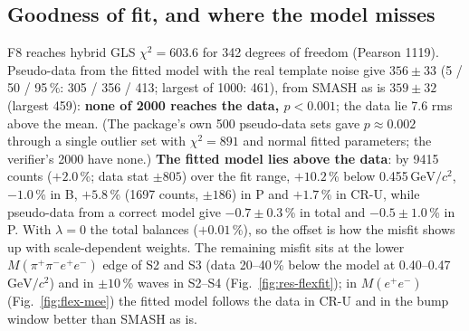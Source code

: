 \documentclass[11pt,a4paper]{article}
\newcommand{\Mfour}{\ensuremath{M(\pi^{+}\pi^{-}e^{+}e^{-})}\xspace}
\newcommand{\Mee}{\ensuremath{M(e^{+}e^{-})}\xspace}
\newcommand{\GeVcc}{\ensuremath{\mathrm{GeV}/c^{2}}\xspace}
\begin{document}
\subsection{Goodness of fit, and where the model misses}
\label{sec:flex-gof}
F8 reaches hybrid GLS $\chi^2=603.6$ for 342 degrees of freedom (Pearson 1119). Pseudo-data from the fitted model with the real template noise give
$356\pm33$ (5 / 50 / 95\,\%: 305 / 356 / 413; largest of 1000: 461), from SMASH as is $359\pm32$ (largest 459): \textbf{none of 2000 reaches the
data, $p<0.001$}; the data lie 7.6 rms above the mean. (The package's own 500 pseudo-data sets gave $p\approx0.002$ through a single outlier set with
$\chi^2=891$ and normal fitted parameters; the verifier's 2000 have none.) \textbf{The fitted model lies above the data}: by 9415 counts ($+2.0$\,\%; data
stat $\pm805$) over the fit range, $+10.2$\,\% below 0.455\,\GeVcc, $-1.0$\,\% in B, $+5.8$\,\% (1697 counts, $\pm186$) in P and $+1.7$\,\% in CR-U, while
pseudo-data from a correct model give $-0.7\pm0.3$\,\% in total and $-0.5\pm1.0$\,\% in P. With $\lambda=0$ the total balances ($+0.01$\,\%), so the
offset is how the misfit shows up with scale-dependent weights. The remaining misfit sits at the lower \Mfour edge of S2 and S3 (data 20--40\,\%
below the model at 0.40--0.47\,\GeVcc) and in $\pm10$\,\% waves in S2--S4 (Fig.~\ref{fig:res-flexfit}); in \Mee (Fig.~\ref{fig:flex-mee}) the fitted
model follows the data in CR-U and in the bump window better than SMASH as is.
\end{document}
